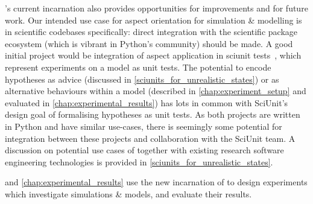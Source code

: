 \pdsf{}'s current incarnation also provides opportunities for improvements and
for future work. Our intended use case for aspect orientation for simulation \&
modelling is in scientific codebases specifically: direct integration with the
scientific package ecosystem (which is vibrant in Python's community) should be
made. A good initial project would be integration of aspect application in
sciunit tests~\cite{sciunit_primer}, which represent experiments on a model as
unit tests. The potential to encode hypotheses as advice (discussed in
\cref{sciunits_for_unrealistic_states}) or as alternative behaviours within a
model (described in \cref{chap:experiment_setup} and evaluated in
\cref{chap:experimental_results}) has lots in common with SciUnit's design goal
of formalising hypotheses as unit tests. As both projects are written in Python
and have similar use-cases, there is seemingly some potential for integration
between these projects and collaboration with the SciUnit team. A discussion on
potential use cases of \pdsf together with existing research software
engineering technologies is provided in \cref{sciunits_for_unrealistic_states}.

 and \cref{chap:experimental_results} use the new
incarnation of \pdsf{} to design experiments which investigate \aspectoriented{}
simulations \& models, and evaluate their results.
